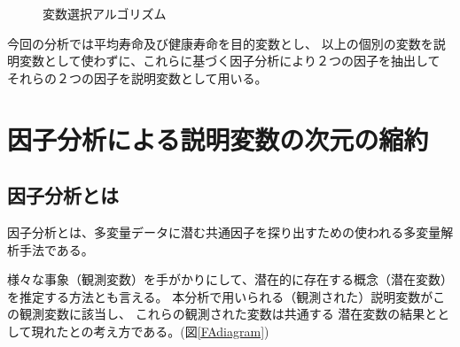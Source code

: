 \documentclass[a4j,11pt,mc]{jreport}
\begin{document}
 \begin{figure}
\centering
	\caption{変数選択アルゴリズム}
	\label{Varsel}
 \end{figure}





%
%
%
%
%
%
%



今回の分析では平均寿命及び健康寿命を目的変数とし、
以上の個別の変数を説明変数として使わずに、これらに基づく因子分析により２つの因子を抽出して
それらの２つの因子を説明変数として用いる。



\chapter{因子分析による説明変数の次元の縮約}\label{chapter:FA}

%
%
%


\section{因子分析とは}

因子分析とは、多変量データに潜む共通因子を探り出すための使われる多変量解析手法である。
%





様々な事象（観測変数）を手がかりにして、潜在的に存在する概念（潜在変数）を推定する方法とも言える。
本分析で用いられる（観測された）説明変数がこの観測変数に該当し、
これらの観測された変数は共通する
潜在変数の結果ととして現れたとの考え方である。(図\ref{FAdiagram})
\end{document}
